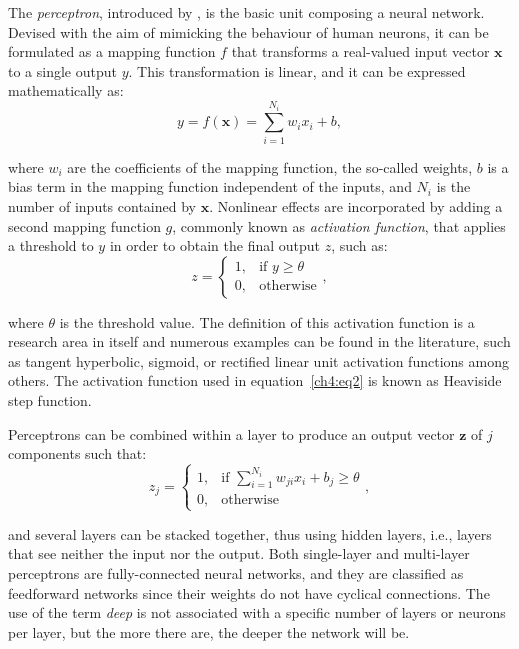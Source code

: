 The \textit{perceptron}, introduced by \citet{rosenblatt1958perceptron}, is the basic unit composing a neural network.
Devised with the aim of mimicking the behaviour of human neurons, it can be formulated as a mapping function $f$ that transforms a real-valued input vector $\boldsymbol{x}$ to a single output $y$.
This transformation is linear, and it can be expressed mathematically as:
\begin{equation}
  y = f(\boldsymbol{x}) = \sum^{N_i}_{i=1}w_ix_i + b,
  \label{ch4:eq1}
\end{equation}

\noindent where $w_i$ are the coefficients of the mapping function, the so-called weights, $b$ is a bias term in the mapping function independent of the inputs, and $N_i$ is the number of inputs contained by $\boldsymbol{x}$.
Nonlinear effects are incorporated by adding a second mapping function $g$, commonly known as \textit{activation function}, that applies a threshold to $y$ in order to obtain the final output $z$, such as:
\begin{equation}
  z =
  \begin{cases}
      1, & \text{if } y\geq \theta\\
      0, & \text{otherwise}
  \end{cases},
  \label{ch4:eq2}
\end{equation}

\noindent where $\theta$ is the threshold value.
The definition of this activation function is a research area in itself and numerous examples can be found in the literature, such as tangent hyperbolic, sigmoid, or rectified linear unit activation functions among others.
The activation function used in equation~\ref{ch4:eq2} is known as Heaviside step function.

Perceptrons can be combined within a layer to produce an output vector $\boldsymbol{z}$ of $j$ components such that:
\begin{equation}
  z_j =
  \begin{cases}
      1, & \text{if } \sum^{N_i}_{i=1}w_{ji}x_i + b_j \geq \theta\\
      0, & \text{otherwise}
  \end{cases},
  \label{ch4:eq3}
\end{equation}

\noindent and several layers can be stacked together, thus using hidden layers, i.e., layers that see neither the input nor the output.
Both single-layer and multi-layer perceptrons are fully-connected neural networks, and they are classified as feedforward networks since their weights do not have cyclical connections.
The use of the term \textit{deep} is not associated with a specific number of layers or neurons per layer, but the more there are, the deeper the network will be.

